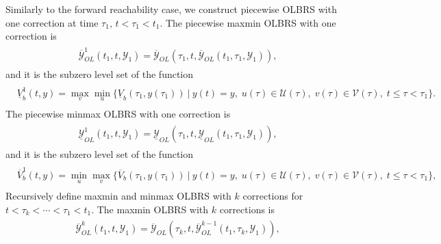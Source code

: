 \documentclass[letterpaper,10pt,english]{sphinxmanual}
\begin{document}
Similarly to the forward reachability case, we construct piecewise OLBRS
with one correction at time $\tau_1$, $t<\tau_1<t_1$. The
piecewise maxmin OLBRS with one correction is
\label{chap_reach:equation-maxminb1}\begin{gather}
\begin{split}\overline{{\mathcal Y}}_{OL}^1(t_1, t, {\mathcal Y}_1) = \overline{{\mathcal Y}}_{OL}(\tau_1, t, \overline{{\mathcal Y}}_{OL}(t_1, \tau_1, {\mathcal Y}_1)),\end{split}\label{chap_reach-maxminb1}
\end{gather}
and it is the subzero level set of the function
\label{chap_reach:equation-maxminvfb1}\begin{gather}
\begin{split}\begin{aligned}
\underline{V}^1_b(t, y) =  \max_v\min_u\{\underline{V}_b(\tau_1, y(\tau_1)) ~|~
y(t)=y, \; u(\tau)\in{\mathcal U}(\tau), \;
v(\tau)\in{\mathcal V}(\tau), \; t\leqslant\tau<\tau_1\}.
\end{aligned}\end{split}\label{chap_reach-maxminvfb1}
\end{gather}
The piecewise minmax OLBRS with one correction is
\label{chap_reach:equation-minmaxb1}\begin{gather}
\begin{split}\underline{{\mathcal Y}}_{OL}^1(t_1, t, {\mathcal Y}_1) = \underline{{\mathcal Y}}_{OL}(\tau_1, t, \underline{{\mathcal Y}}_{OL}(t_1, \tau_1, {\mathcal Y}_1)),\end{split}\label{chap_reach-minmaxb1}
\end{gather}
and it is the subzero level set of the function
\label{chap_reach:equation-minmaxvfb1}\begin{gather}
\begin{split}\begin{aligned}
\overline{V}^1_b(t, y) = \min_u\max_v\{\overline{V}_b(\tau_1, y(\tau_1)) ~|~
y(t)=y, \; u(\tau)\in{\mathcal U}(\tau), \;
v(\tau)\in{\mathcal V}(\tau), \; t\leqslant\tau<\tau_1\},
\end{aligned}\end{split}\label{chap_reach-minmaxvfb1}
\end{gather}
Recursively define maxmin and minmax OLBRS with $k$ corrections
for $t<\tau_k<\cdots<\tau_1<t_1$. The maxmin OLBRS with $k$
corrections is
\label{chap_reach:equation-maxminbk}\begin{gather}
\begin{split}\overline{{\mathcal Y}}_{OL}^k(t_1, t, {\mathcal Y}_1) = \overline{{\mathcal Y}}_{OL}(\tau_k, t, \overline{{\mathcal Y}}_{OL}^{k-1}(t_1, \tau_k, {\mathcal Y}_1)),\end{split}\label{chap_reach-maxminbk}
\end{gather}
\end{document}
